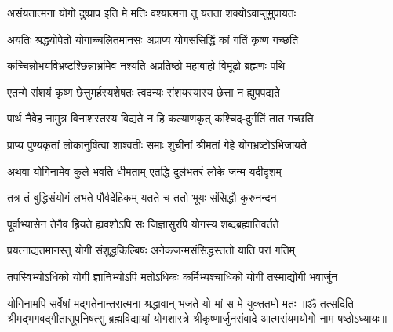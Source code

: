 \twolineshloka
{असंयतात्मना योगो दुष्प्राप इति मे मतिः}
{वश्यात्मना तु यतता शक्योऽवाप्तुमुपायतः}%

\twolineshloka
{अयतिः श्रद्धयोपेतो योगाच्चलितमानसः}
{अप्राप्य योगसंसिद्धिं कां गतिं कृष्ण गच्छति}%

\twolineshloka
{कच्चिन्नोभयविभ्रष्टश्छिन्नाभ्रमिव नश्यति}
{अप्रतिष्ठो महाबाहो विमूढो ब्रह्मणः पथि}%

\twolineshloka
{एतन्मे संशयं कृष्ण छेत्तुमर्हस्यशेषतः}
{त्वदन्यः संशयस्यास्य छेत्ता न ह्युपपद्यते}%

\twolineshloka
{पार्थ नैवेह नामुत्र विनाशस्तस्य विद्यते}
{न हि कल्याणकृत् कश्चिद्-दुर्गतिं तात गच्छति}%

\twolineshloka
{प्राप्य पुण्यकृतां लोकानुषित्वा शाश्वतीः समाः}
{शुचीनां श्रीमतां गेहे योगभ्रष्टोऽभिजायते}%

\twolineshloka
{अथवा योगिनामेव कुले भवति धीमताम्}
{एतद्धि दुर्लभतरं लोके जन्म यदीदृशम्}%

\twolineshloka
{तत्र तं बुद्धिसंयोगं लभते पौर्वदेहिकम्}
{यतते च ततो भूयः संसिद्धौ कुरुनन्दन}%

\twolineshloka
{पूर्वाभ्यासेन तेनैव ह्रियते ह्यवशोऽपि सः}
{जिज्ञासुरपि योगस्य शब्दब्रह्मातिवर्तते}%

\twolineshloka
{प्रयत्नाद्यतमानस्तु योगी संशुद्धकिल्बिषः}
{अनेकजन्मसंसिद्धस्ततो याति परां गतिम्}%

\twolineshloka
{तपस्विभ्योऽधिको योगी ज्ञानिभ्योऽपि मतोऽधिकः}
{कर्मिभ्यश्चाधिको योगी तस्माद्योगी भवार्जुन}%

\twolineshloka
{योगिनामपि सर्वेषां मद्गतेनान्तरात्मना}
{श्रद्धावान् भजते यो मां स मे युक्ततमो मतः}%
{॥ॐ तत्सदिति श्रीमद्भगवद्गीतासूपनिषत्सु ब्रह्मविद्यायां योगशास्त्रे श्रीकृष्णार्जुनसंवादे आत्मसंयमयोगो नाम षष्ठोऽध्यायः॥}
